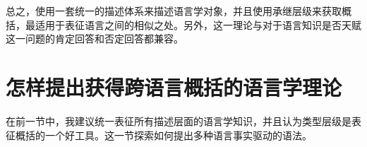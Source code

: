 总之，使用一套统一的描述体系来描述语言学对象，并且使用承继层级来获取概括，最适用于表征语言之间的相似之处。另外，这一理论与对于语言知识是否天赋这一问题的肯定回答和否定回答都兼容。

\section{怎样提出获得跨语言概括的语言学理论}
\label{sec-develop-theories-coregram}

在前一节中，我建议统一表征所有描述层面的语言学知识，并且认为类型层级是表征概括的一个好工具。这一节探索如何提出多种语言事实驱动的语法。

